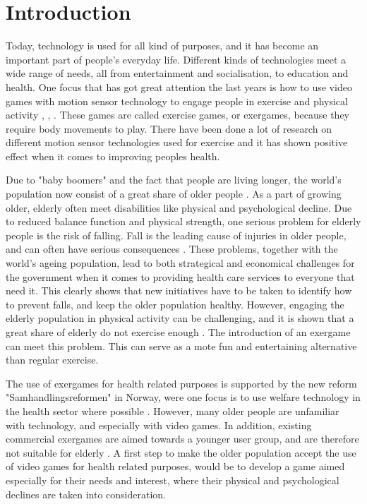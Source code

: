 \chapter{Introduction}

Today, technology is used for all kind of purposes, and it has become an important part of people's everyday life. Different kinds of technologies meet a wide range of needs, all from entertainment and socialisation, to education and health. One focus that has got great attention the last years is how to use video games with motion sensor technology to engage people in exercise and physical activity \cite{exergamesforelderly}, \cite{gerling1}, \cite{garcia2012exergames}. These games are called exercise games, or exergames, because they require body movements to play. There have been done a lot of research on different motion sensor technologies used for exercise and it has shown positive effect when it comes to improving peoples health. 

Due to "baby boomers" and the fact that people are living longer, the world's population now consist of a great share of older people \cite{dickinson2007methods}. As a part of growing older, elderly often meet disabilities like physical and psychological decline. Due to reduced balance function and physical strength, one serious problem for elderly people is the risk of falling. Fall is the leading cause of injuries in older people, and can often have serious consequences \cite{otago}. These problems, together with the world's ageing population, lead to both strategical and economical challenges for the government when it comes to providing health care services to everyone that need it. This clearly shows that new initiatives have to be taken to identify how to prevent falls, and keep the older population healthy. However, engaging the elderly population in physical activity can be challenging, and it is shown that a great share of elderly do not exercise enough \cite{statistikknorge12}. The introduction of an exergame can meet this problem. This can serve as a mote fun and entertaining alternative than regular exercise.  

The use of exergames for health related purposes is supported by the new reform "Samhandlingsreformen" in Norway, were one focus is to use welfare technology in the health sector where possible \cite{welfare}. However, many older people are unfamiliar with technology, and especially with video games. In addition, existing commercial exergames are aimed towards a younger user group, and are therefore not suitable for elderly \cite{exergamesforelderly}. A first step to make the older population accept the use of video games for health related purposes, would be to develop a game aimed especially for their needs and interest, where their physical and psychological declines are taken into consideration. 

